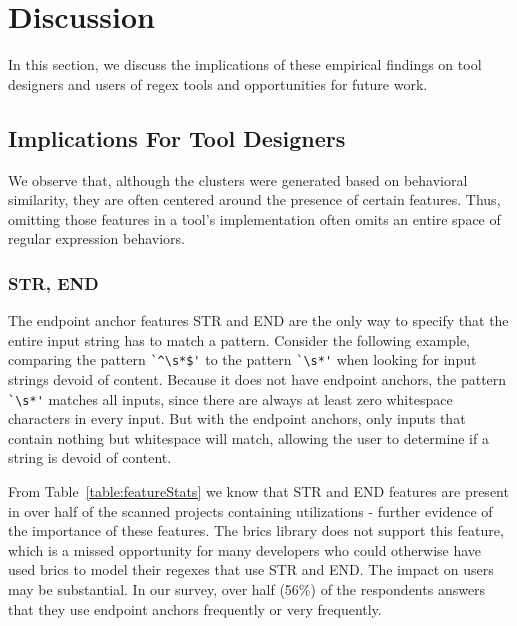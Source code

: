 \section{Discussion}
\label{sec:discussion}

In this section, we discuss the implications of these empirical findings on tool designers and users of regex tools and opportunities for future work.



\subsection{Implications For Tool Designers}

We observe that, although the clusters were generated based on behavioral similarity, they are often centered around the presence of certain features. Thus, omitting those features in a tool's implementation often omits an entire space of regular expression behaviors.


\subsubsection{STR, END}
The endpoint anchor features STR and END are the only way to specify that the entire input string has to match a pattern.  Consider the following example, comparing the pattern \verb!`^\s*$'! to the pattern \verb!`\s*'! when looking for input strings devoid of content.  Because it does not have endpoint anchors, the pattern \verb!`\s*'! matches all inputs, since there are always at least zero whitespace characters in every input.  But with the endpoint anchors, only inputs that contain nothing but whitespace will match, allowing the user to determine if a string is devoid of content.

From Table~\ref{table:featureStats} we know that STR and END features are present in over half of the scanned projects containing utilizations - further evidence of the importance of these features.  The brics library does not support this feature, which is a missed opportunity for many developers who could otherwise have used brics to model their regexes that use STR and END. The impact on users may be substantial. In our survey, over half (56\%) of the respondents answers that they use endpoint anchors frequently or very frequently.


